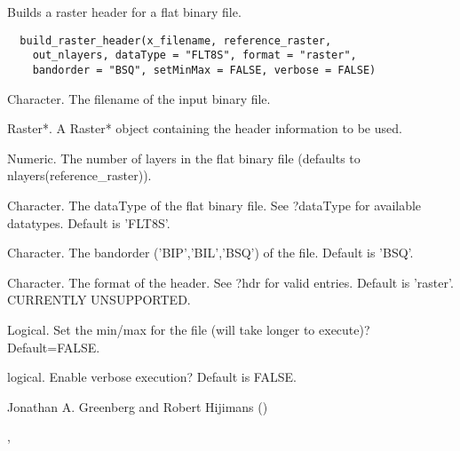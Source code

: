 \documentclass[a4paper]{book}
\begin{document}
%
\begin{Description}\relax
Builds a raster header for a flat binary file.
\end{Description}
%
\begin{Usage}
\begin{verbatim}
  build_raster_header(x_filename, reference_raster,
    out_nlayers, dataType = "FLT8S", format = "raster",
    bandorder = "BSQ", setMinMax = FALSE, verbose = FALSE)
\end{verbatim}
\end{Usage}
%
\begin{Arguments}
\begin{ldescription}
\item[\code{x\_filename}] Character. The filename of the input
binary file.

\item[\code{reference\_raster}] Raster*. A Raster* object
containing the header information to be used.

\item[\code{out\_nlayers}] Numeric. The number of layers in the
flat binary file (defaults to
nlayers(reference\_raster)).

\item[\code{dataType}] Character. The dataType of the flat
binary file.  See ?dataType for available datatypes.
Default is 'FLT8S'.

\item[\code{bandorder}] Character. The bandorder
('BIP','BIL','BSQ') of the file. Default is 'BSQ'.

\item[\code{format}] Character. The format of the header.  See
?hdr for valid entries.  Default is 'raster'.  CURRENTLY
UNSUPPORTED.

\item[\code{setMinMax}] Logical. Set the min/max for the file
(will take longer to execute)?  Default=FALSE.

\item[\code{verbose}] logical. Enable verbose execution? Default
is FALSE.
\end{ldescription}
\end{Arguments}
%
\begin{Author}\relax
Jonathan A. Greenberg and Robert Hijimans
()
\end{Author}
%
\begin{SeeAlso}\relax
{},
\end{SeeAlso}
\end{document}
